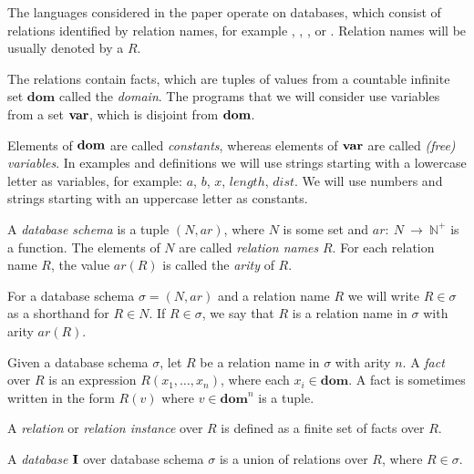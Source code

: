 The languages considered in the paper operate on databases, which consist of relations identified by relation names, for example , , ,  or . Relation names will be usually denoted by a $R$.  

The relations contain facts, which are tuples of values from a countable infinite set $\textbf{dom}$ called the \emph{domain}. The programs that we will consider use variables from a set $\bf{var}$, which is disjoint from $\bf{dom}$. 

Elements of $\bf{dom}$ are called \emph{constants}, whereas elements of $\bf{var}$ are called \emph{(free) variables}.
In examples and definitions we will use strings starting with a lowercase letter as variables, for example: $a$, $b$, $x$, $length$, $dist$. We will use numbers and strings starting with an uppercase letter as constants. 


\begin{defn}


A \emph{database schema} is a tuple $(N, ar)$, where $N$ is some set and $ar:~N~\to~\mathbb{N}^+$ is a function. The elements of $N$ are called \emph{relation names} $R$. For each relation name $R$, the value $ar(R)$ is called the \emph{arity} of $R$.

For a database schema $\sigma = (N, ar)$ and a relation name $R$ we will write $R \in \sigma$ as a shorthand for $R \in N$. If $R \in \sigma$, we say that $R$ is a relation name in $\sigma$ with arity $ar(R)$.

Given a database schema $\sigma$, let $R$ be a relation name in $\sigma$ with arity $n$. A \emph{fact} over $R$ is an expression $R(x_1 , \dots , x_n)$, where each $x_i \in \textbf{dom}$. A fact is sometimes written in the form $R(v)$ where $v \in \textbf{dom}^n$ is a tuple.

A \emph{relation} or \emph{relation instance} over $R$ is defined as a finite set of facts over $R$.

A \emph{database} $\bf{I}$ over database schema $\sigma$ is a union  of relations over $R$, where $R \in \sigma$. 

\end{defn}

